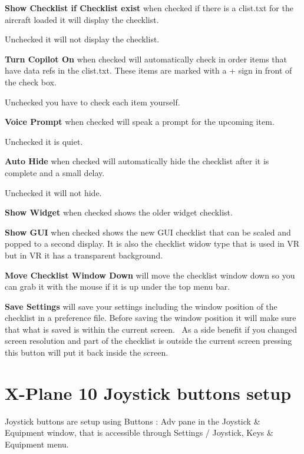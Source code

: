 \documentclass[11pt,parskip=half,a4paper]{scrartcl}
\begin{document}
\textbf{Show Checklist if Checklist exist} when checked if there is a clist.txt for the aircraft loaded it will 
display the checklist. 

Unchecked it will not display the checklist. \newline

\textbf{Turn Copilot On} when checked will automatically check in order items that have data refs in the 
clist.txt. These items are marked with a + sign in front of the check box. 

Unchecked you have to check each item yourself. \newline

\textbf{Voice Prompt} when checked will speak a prompt for the upcoming item.

Unchecked it is quiet. \newline

\textbf{Auto Hide} when checked will automatically hide the checklist after it is complete and a small delay. 

Unchecked it will not hide. \newline

\newpage

\textbf{Show Widget} when checked shows the older widget checklist. \newline

\textbf{Show GUI} when checked shows the new GUI checklist that can be scaled and popped to a second display.
It is also the checklist widow type that is used in VR but in VR it has a transparent background. \newline

\textbf{Move Checklist Window Down} will move the checklist window down so you can grab it with the mouse if it is up under the top menu bar. \newline

\textbf{Save Settings} will save your settings including the window position of the checklist in a preference file. Before saving the window position it will make sure that what is saved is within the current screen. \ As a side benefit if you changed screen resolution and part of the checklist is outside the current screen pressing this button will put it back inside the screen.

\newpage
\section{X-Plane 10 Joystick buttons setup}

Joystick buttons are setup using Buttons : Adv pane in the Joystick \& Equipment window, that is accessible through Settings / Joystick, Keys \& Equipment menu.
\end{document}
